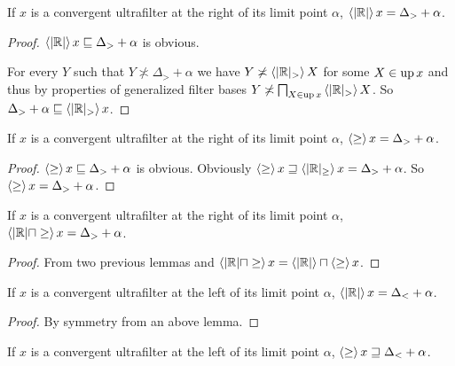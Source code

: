 \begin{lem}
  If $x$ is a convergent ultrafilter at the right of its limit point $\alpha$,
  $\left\langle | \mathbb{R} |\right\rangle x = \Delta_{>} + \alpha$.
\end{lem}

\begin{proof}
  $\left\langle | \mathbb{R} |\right\rangle x \sqsubseteq \Delta_{>} + \alpha$ is
  obvious.
  
  For every $Y$ such that $Y \nasymp \Delta_{>} + \alpha$ we have $Y \not\asymp
  \left\langle | \mathbb{R} |_{>}\right\rangle X$ for some $X \in \operatorname{up} x$ and thus
  by properties of generalized filter bases $Y \not\asymp \bigsqcap_{X \in
  \operatorname{up} x} \left\langle | \mathbb{R} |_{>}\right\rangle X$. So $\Delta_{>} + \alpha
  \sqsubseteq \left\langle | \mathbb{R} |_{>}\right\rangle x$.
\end{proof}

\begin{lem}
  If $x$ is a convergent ultrafilter at the right of its limit point $\alpha$,
  $\left\langle \geq\right\rangle x = \Delta_{>} + \alpha$.
\end{lem}

\begin{proof}
  $\left\langle \geq\right\rangle x \sqsubseteq \Delta_{>} + \alpha$ is obvious.
  Obviously $\left\langle \geq\right\rangle x \sqsupseteq \left\langle  | \mathbb{R} |_{\geq}
  \right\rangle x = \Delta_{>} + \alpha$. So $\left\langle \geq\right\rangle x = \Delta_{>} +
  \alpha$.
\end{proof}

\begin{lem}
  If $x$ is a convergent ultrafilter at the right of its limit point $\alpha$,
  $\left\langle  | \mathbb{R} | \sqcap \geq \right\rangle x = \Delta_{>} + \alpha$.
\end{lem}

\begin{proof}
  From two previous lemmas and $\left\langle  | \mathbb{R} | \sqcap \geq \right\rangle x
  = \left\langle | \mathbb{R} |\right\rangle \sqcap \left\langle \geq\right\rangle x$.
\end{proof}

\begin{lem}
  If $x$ is a convergent ultrafilter at the left of its limit point $\alpha$,
  $\left\langle | \mathbb{R} |\right\rangle x = \Delta_{<} + \alpha$.
\end{lem}

\begin{proof}
  By symmetry from an above lemma.
\end{proof}

\begin{lem}
  If $x$ is a convergent ultrafilter at the left of its limit point $\alpha$,
  $\left\langle \geq\right\rangle x \sqsupseteq \Delta_{<} + \alpha$.
\end{lem}

